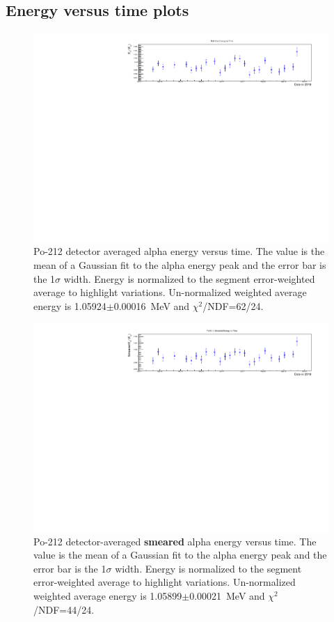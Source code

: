 \subsection{Energy versus time plots}
\begin{figure}[!h]
\centering
\includegraphics[width=1.05\textwidth]{figures/PubBiPo212EvsT.pdf}
\caption{\label{fig:EvsT212}Po-212 detector averaged alpha energy versus time. The value is the mean of a Gaussian fit to the alpha energy peak and the error bar is the 1$\sigma$ width. Energy is normalized to the segment error-weighted average to highlight variations. Un-normalized weighted average energy is 1.05924$\pm$0.00016~MeV and $\chi^2$/NDF=62/24. }
\end{figure}
\begin{figure}[!h]
\centering
\includegraphics[width=1.05\textwidth]{figures/PubBiPo212EsmearvsT.pdf}
\caption{\label{fig:EsmearvsT212}Po-212 detector-averaged {\bf smeared} alpha energy versus time. The value is the mean of a Gaussian fit to the alpha energy peak and the error bar is the 1$\sigma$ width. Energy is normalized to the segment error-weighted average to highlight variations. Un-normalized weighted average energy is 1.05899$\pm$0.00021~MeV and $\chi^2$/NDF=44/24. }
\end{figure}
